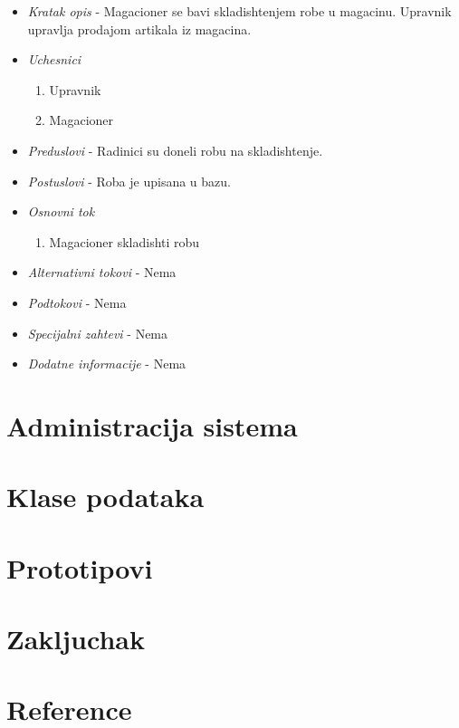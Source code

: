 \documentclass[10 pt]{article}
\begin{document}
	\begin{itemize}
		
		\item \textit{Kratak opis} - Magacioner se bavi skladishtenjem robe u magacinu. Upravnik upravlja prodajom artikala iz magacina.
		
		\item \textit{Uchesnici}
		\begin{enumerate}
			\item Upravnik
			\item Magacioner
		\end{enumerate}
		
		\item \textit{Preduslovi} - Radinici su doneli robu na skladishtenje.
		
		\item \textit{Postuslovi} - Roba je upisana u bazu.
		
		\item \textit{Osnovni tok}
		\begin{enumerate}
			\item Magacioner skladishti robu
		\end{enumerate}
		
		\item \textit{Alternativni tokovi} - Nema
		
		\item \textit{Podtokovi} - Nema
		
		\item \textit{Specijalni zahtevi} - Nema
		
		\item \textit{Dodatne informacije} - Nema
		
	\end{itemize}
	
	
\section{Administracija sistema}

\section{Klase podataka}

\section{Prototipovi}
\section{Zakljuchak}
\section{Reference}
\end{document}
